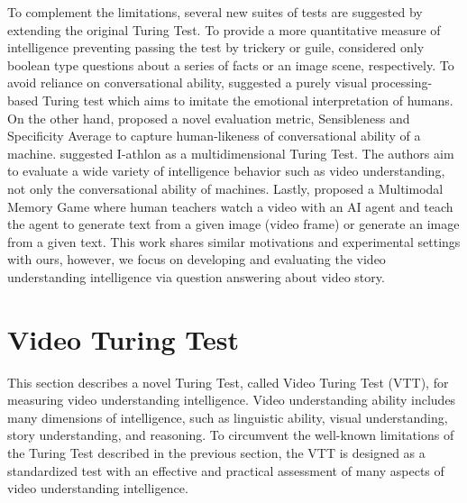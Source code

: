 \documentclass[letterpaper]{article} %
\begin{document}
To complement the limitations, several new suites of tests are suggested by extending the original Turing Test.
To provide a more quantitative measure of intelligence preventing passing the test by trickery or guile, \cite{mckinstry1997minimum,geman2015visual} considered only boolean type questions about a series of facts or an image scene, respectively.
To avoid reliance on conversational ability, \cite{olague2021less} suggested a purely visual processing-based Turing test which aims to imitate the emotional interpretation of humans. On the other hand, \cite{adiwardana2020meena} proposed a novel evaluation metric, Sensibleness and Specificity Average to capture human-likeness of conversational ability of a machine.
\cite{adams2016athlon} suggested I-athlon as a multidimensional Turing Test. The authors aim to evaluate a wide variety of intelligence behavior such as video understanding, not only the conversational ability of machines.
Lastly, \cite{zhang2009teaching} proposed a Multimodal Memory Game where human teachers watch a video with an AI agent and teach the agent to generate text from a given image (video frame) or generate an image from a given text. This work shares similar motivations and experimental settings with ours, however, we focus on developing and evaluating the video understanding intelligence via question answering about video story.

\section{Video Turing Test}\label{sec:vtt} %
This section describes a novel Turing Test, called Video Turing Test (VTT), for measuring video understanding intelligence. Video understanding ability includes many dimensions of intelligence, such as linguistic ability, visual understanding, story understanding, and reasoning. To circumvent the well-known limitations of the Turing Test described in the previous section, the VTT is designed as a standardized test with an effective and practical assessment of many aspects of video understanding intelligence.
\end{document}

